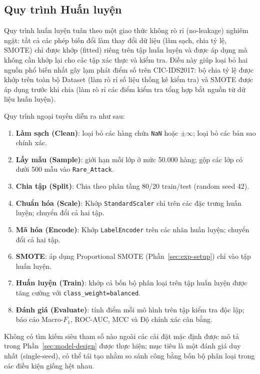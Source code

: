 \subsection{Quy trình Huấn luyện}
\label{sec:training}

Quy trình huấn luyện tuân theo một giao thức không rò rỉ (no-leakage) nghiêm ngặt: tất cả các phép biến đổi làm thay đổi dữ liệu (làm sạch, chia tỷ lệ, SMOTE) chỉ được khớp (fitted) riêng trên tập huấn luyện và được áp dụng mà không cần khớp lại cho các tập xác thực và kiểm tra. Điều này giúp loại bỏ hai nguồn phổ biến nhất gây lạm phát điểm số trên CIC-IDS2017: bộ chia tỷ lệ được khớp trên toàn bộ Dataset (làm rò rỉ số liệu thống kê kiểm tra) và SMOTE được áp dụng trước khi chia (làm rò rỉ các điểm kiểm tra tổng hợp bắt nguồn từ dữ liệu huấn luyện).

Quy trình ngoại tuyến diễn ra như sau:
\begin{enumerate}
    \item \textbf{Làm sạch (Clean)}: loại bỏ các hàng chứa \texttt{NaN} hoặc $\pm\infty$; loại bỏ các bản sao chính xác.
    \item \textbf{Lấy mẫu (Sample)}: giới hạn mỗi lớp ở mức 50.000 hàng; gộp các lớp có dưới 500 mẫu vào \texttt{Rare\_Attack}.
    \item \textbf{Chia tập (Split)}: Chia theo phân tầng 80/20 train/test (random seed 42).
    \item \textbf{Chuẩn hóa (Scale)}: Khớp \texttt{StandardScaler} chỉ trên các đặc trưng huấn luyện; chuyển đổi cả hai tập.
    \item \textbf{Mã hóa (Encode)}: Khớp \texttt{LabelEncoder} trên các nhãn huấn luyện; chuyển đổi cả hai tập.
    \item \textbf{SMOTE}: áp dụng Proportional SMOTE (Phần~\ref{sec:exp-setup}) chỉ vào tập huấn luyện.
    \item \textbf{Huấn luyện (Train)}: khớp cả bốn bộ phân loại trên tập huấn luyện được tăng cường với \texttt{class\_weight=balanced}.
    \item \textbf{Đánh giá (Evaluate)}: tính điểm mỗi mô hình trên tập kiểm tra độc lập; báo cáo Macro-$F_1$, ROC-AUC, MCC và Độ chính xác cân bằng.
\end{enumerate}

Không có tìm kiếm siêu tham số nào ngoài các cài đặt mặc định được mô tả trong Phần~\ref{sec:model-design} được thực hiện; mục tiêu là một đánh giá duy nhất (single-seed), có thể tái tạo nhằm so sánh công bằng bốn bộ phân loại trong các điều kiện giống hệt nhau.
